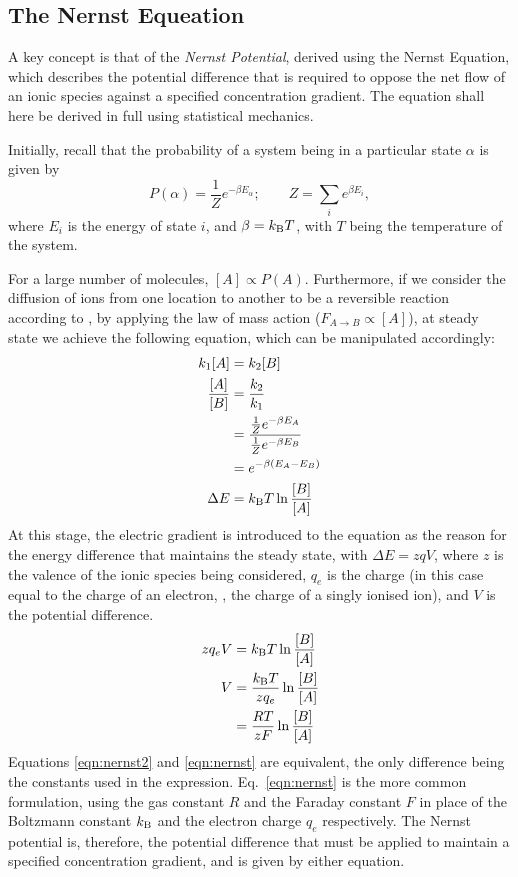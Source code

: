 \documentclass[../thesis-main.tex]{subfiles}
\begin{document}
 \subsection{The Nernst Equeation}
 \label{subsec:nernst}
 A key concept is that of the \emph{Nernst Potential}, derived using the Nernst Equation, which describes the potential difference that is required to oppose the net flow of an ionic species against a specified concentration gradient. The equation shall here be derived in full using statistical mechanics.
 
 Initially, recall that the probability of a system being in a particular state $\alpha$ is given by
 \begin{equation}
  P(\alpha) = \frac{1}{Z}e^{-\beta E_\alpha}; \qquad Z = \sum_i e^{\beta E_i},
 \end{equation}
 where $E_i$ is the energy of state $i$, and $\beta = k_\textnormal{B}T$, with $T$ being the temperature of the system.
 
 For a large number of molecules, $[A] \propto P(A)$. Furthermore, if we consider the diffusion of ions from one location to another to be a reversible reaction according to , by applying the law of mass action ($F_{A\rightarrow B} \propto [A]$), at steady state we achieve the following equation, which can be manipulated accordingly:
 \begin{align}
  k_1[A]		& = k_2[B] \\
  \frac{[A]}{[B]}	& = \frac{k_2}{k_1} \\
			& = \frac{\frac{1}{Z}e^{-\beta E_A}}{\frac{1}{Z}e^{-\beta E_B}} \\
			& = e^{-\beta(E_A-E_B)} \\
  \Delta E		& = k_\textnormal{B}T\ln\frac{[B]}{[A]}
 \end{align}
 At this stage, the electric gradient is introduced to the equation as the reason for the energy difference that maintains the steady state, with $\Delta E = zqV$, where $z$ is the valence of the ionic species being considered, $q_e$ is the charge (in this case equal to the charge of an electron, \idest, the charge of a singly ionised ion), and $V$ is the potential difference.
 \begin{align}
  zq_eV	& = k_\textnormal{B}T\ln\frac{[B]}{[A]} \\
  V	& = \frac{k_\textnormal{B}T}{zq_e}\ln\frac{[B]}{[A]} 	\label{eqn:nernst2} \\
	& = \frac{RT}{zF}\ln\frac{[B]}{[A]} 			\label{eqn:nernst} \\
 \end{align}
 Equations \ref{eqn:nernst2} and \ref{eqn:nernst} are equivalent, the only difference being the constants used in the expression. Eq.~\ref{eqn:nernst} is the more common formulation, using the gas constant $R$ and the Faraday constant $F$ in place of the Boltzmann constant $k_\textnormal{B}$ and the electron charge $q_e$ respectively. The Nernst potential is, therefore, the potential difference that must be applied to maintain a specified concentration gradient, and is given by either equation.
\end{document}
